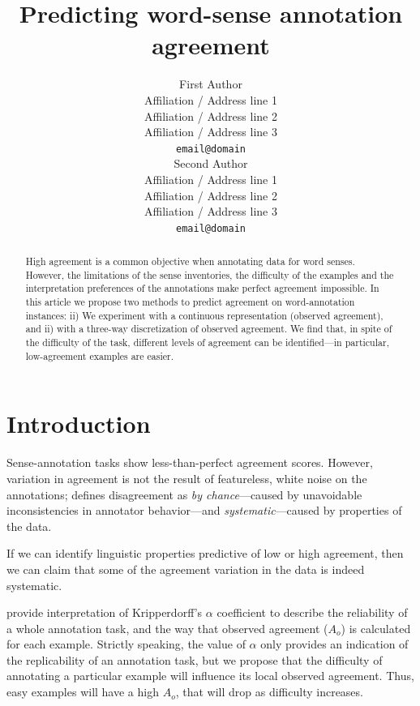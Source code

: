 \documentclass[11pt,a4paper]{article}
\title{Predicting word-sense annotation agreement}
\author{First Author \\
  Affiliation / Address line 1 \\
  Affiliation / Address line 2 \\
  Affiliation / Address line 3 \\
  {\tt email@domain} \\\And
  Second Author \\
  Affiliation / Address line 1 \\
  Affiliation / Address line 2 \\
  Affiliation / Address line 3 \\
  {\tt email@domain} \\}
\date{}
\begin{document}
\maketitle
\begin{abstract}


High agreement is a common objective when annotating data for word senses.  However, the limitations of the sense inventories, the difficulty of the examples and the interpretation preferences of the annotations make perfect agreement impossible.
In this article we propose two methods to predict agreement on word-annotation instances: ii) We experiment with a continuous representation (observed agreement), and ii) with a three-way discretization of observed agreement. We find that, in spite of the difficulty of the task, different levels of agreement can be identified---in particular, low-agreement examples are easier.
\end{abstract}
\section{Introduction}

Sense-annotation tasks show less-than-perfect agreement scores. However, variation in agreement is not the result of featureless, white noise on the annotations;  defines disagreement as \textit{by chance}---caused by unavoidable inconsistencies in annotator behavior---and \textit{systematic}---caused by properties of the data.

If we can identify linguistic properties predictive of low or high agreement, then we can claim that some of the agreement variation in the data is indeed systematic. %



 provide interpretation of Kripperdorff's $\alpha$ coefficient to describe the reliability of a whole annotation task, and the way that observed agreement ($A_o$) is calculated for each example. Strictly speaking, the value of $\alpha$ only provides an indication of the replicability of an annotation task, but we propose that the difficulty of annotating a particular example will influence its local observed agreement. Thus, easy examples will have a high $A_o$, that will drop as difficulty increases. 


\end{document}

